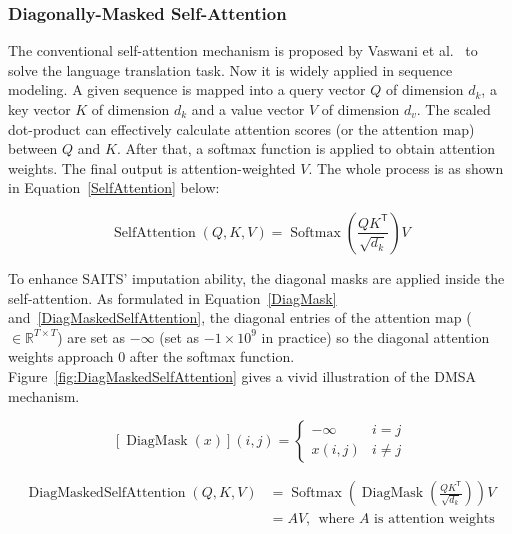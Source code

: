\documentclass{article}
\begin{document}
\subsubsection{Diagonally-Masked Self-Attention} \label{SAITS: diagonally-masked SA}
The conventional self-attention mechanism is proposed by Vaswani et al.~\cite{Vaswani2017SelfAttention} to solve the language translation task. Now it is widely applied in sequence modeling. A given sequence is mapped into a query vector $Q$ of dimension $d_k$, a key vector $K$ of dimension $d_k$ and a value vector $V$ of dimension $d_v$. The scaled dot-product can effectively calculate attention scores (or the attention map) between $Q$ and $K$. After that, a softmax function is applied to obtain attention weights. The final output is attention-weighted $V$. The whole process is as shown in Equation~\ref{SelfAttention} below:

\begin{equation}
	\label{SelfAttention}
	\operatorname{SelfAttention}\left(Q, K, V\right) =\operatorname{Softmax}\left(\frac{Q K^\mathsf{T}}{\sqrt{d_{k}}}\right) V
\end{equation}

To enhance SAITS' imputation ability, the diagonal masks are applied inside the self-attention. As formulated in Equation~\ref{DiagMask} and~\ref{DiagMaskedSelfAttention}, the diagonal entries of the attention map ($\in \mathbb{R}^{T \times T}$) are set as $-\infty$ (set as $-1 \times 10^9$ in practice) so the diagonal attention weights approach 0 after the softmax function. Figure~\ref{fig:DiagMaskedSelfAttention} gives a vivid illustration of the DMSA mechanism.

\begin{equation} \label{DiagMask}
	\left[ \operatorname{DiagMask}\left(x\right) \right]\left(i, j\right) = \left\{\begin{array}{ll}
		-\infty & i=j \\
		x \left(i, j\right) & i\neq j
	\end{array}\right.
\end{equation}

\begin{equation} \label{DiagMaskedSelfAttention}
	\begin{aligned}
		\operatorname{DiagMaskedSelfAttention}\left(Q, K, V\right) &=\operatorname{Softmax}\left(\operatorname{DiagMask}\left(\frac{Q K^\mathsf{T}}{\sqrt{d_{k}}}\right)\right) V \\
		&=A V, \ \ \text{where } A \text{ is attention weights} \\
	\end{aligned}
\end{equation}
\end{document}
